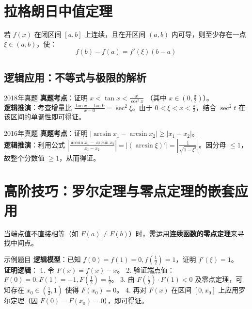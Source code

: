 \documentclass[UTF8]{ctexart}
\begin{document}
\section{拉格朗日中值定理}

\begin{conceptbox}[定理 2：拉格朗日中值定理]
若 $f(x)$ 在闭区间 $[a, b]$ 上连续，且在开区间 $(a, b)$ 内可导，则至少存在一点 $\xi \in (a, b)$，使：
$$f(b) - f(a) = f'(\xi)(b - a)$$
\end{conceptbox}

\subsection{逻辑应用：不等式与极限的解析}

\begin{examnote}{2018年真题}
\textbf{真题考点}：证明 $x < \tan x < \frac{x}{\cos^2 x}$ （其中 $x \in (0, \frac{\pi}{2})$）。\\
\textbf{逻辑推演}：考查增量比 $\frac{\tan x - \tan 0}{x - 0} = \sec^2 \xi$。由于 $0 < \xi < x < \frac{\pi}{2}$，结合 $\sec^2 t$ 在该区间的单调性即可得证。
\end{examnote}

\begin{examnote}{2016年真题}
\textbf{真题考点}：证明 $|\arcsin x_1 - \arcsin x_2| \ge |x_1 - x_2|$。\\
\textbf{逻辑推演}：利用公式 $|\frac{\arcsin x_1 - \arcsin x_2}{x_1 - x_2}| = |(\arcsin \xi)'| = |\frac{1}{\sqrt{1-\xi^2}}|$。因分母 $\le 1$，故整个分数值 $\ge 1$，从而得证。
\end{examnote}

\section{高阶技巧：罗尔定理与零点定理的嵌套应用}
当端点值不直接相等（如 $F(a) \neq F(b)$）时，需运用\textbf{连续函数的零点定理}来寻找中间点。

\begin{examnote}{示例题目}
\textbf{逻辑模型}：已知 $f(0)=f(1)=0, f(\frac{1}{2})=1$，证明 $f'(\xi)=1$。\\
\textbf{证明逻辑}：
1. 令 $F(x)=f(x)-x$。
2. 验证端点值：$F(0)=0, F(1)=-1, F(\frac{1}{2})=\frac{1}{2}$。
3. 由 $F(\frac{1}{2}) \cdot F(1) < 0$ 及零点定理，可知存在 $x_0 \in (\frac{1}{2}, 1)$ 使得 $F(x_0)=0$。
4. 再对 $F(x)$ 在区间 $[0, x_0]$ 上应用罗尔定理（因 $F(0)=F(x_0)=0$），即可得证。
\end{examnote}
\end{document}
